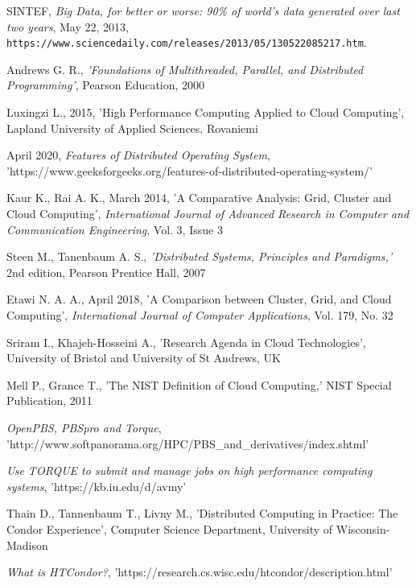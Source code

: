 \documentclass[10pt]{report}
\begin{document}
\newpage
    \begin{thebibliography}{9}
SINTEF,
\textit{Big Data, for better or worse: 90\% of world's data generated over last two years},
May 22, 2013,
\\\texttt{https://www.sciencedaily.com/releases/2013/05/130522085217.htm}.

Andrews G. R., \textit{'Foundations of Multithreaded, Parallel, and Distributed Programming'}, Pearson Education, 2000

Luxingzi L., 2015, 'High Performance Computing Applied to Cloud Computing', Lapland University of Applied Sciences, Rovaniemi

April 2020, \textit{Features of Distributed Operating System}, 'https://www.geeksforgeeks.org/features-of-distributed-operating-system/'

Kaur K., Rai A. K., March 2014, 'A Comparative Analysis: Grid, Cluster and Cloud Computing', \textit{International Journal of Advanced Research in Computer and Communication Engineering}, Vol. 3, Issue 3

Steen M., Tanenbaum A. S., \textit{'Distributed Systems, Principles and Paradigms,'} 2nd edition, Pearson Prentice Hall, 2007

Etawi N. A. A., April 2018, 'A Comparison between Cluster, Grid, and Cloud Computing', \textit{International Journal of Computer Applications}, Vol. 179, No. 32

Sriram I., Khajeh-Hosseini A., 'Research Agenda in Cloud Technologies', University of Bristol and University of St Andrews, UK

Mell P., Grance T., 'The NIST Definition of Cloud Computing,' NIST Special Publication, 2011

\textit{OpenPBS, PBSpro and Torque}, 'http://www.softpanorama.org/HPC/PBS\_and\_derivatives/index.shtml'

\textit{Use TORQUE to submit and manage jobs on high performance computing systems}, 'https://kb.iu.edu/d/avmy'

Thain D., Tannenbaum T., Livny M., 'Distributed Computing in Practice: The Condor Experience', Computer Science Department, University of Wisconsin-Madison

\textit{What is HTCondor?}, 'https://research.cs.wisc.edu/htcondor/description.html'


\end{thebibliography}
\end{document}
